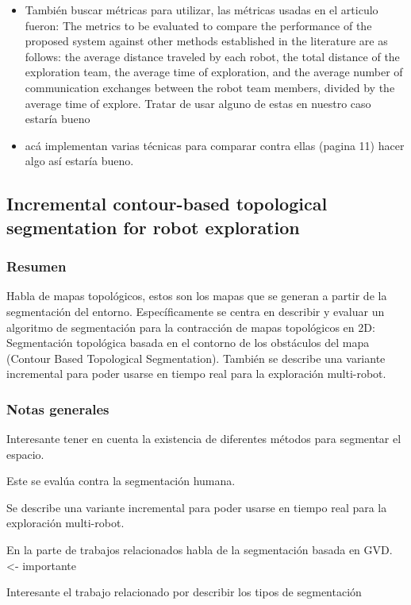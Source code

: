 \begin{itemize}
\item También buscar métricas para utilizar, las métricas usadas en el articulo fueron: The metrics to be evaluated to compare the performance of the proposed system against other methods established in the literature are as follows: the average distance traveled by each robot, the total distance of the exploration team, the average time of exploration, and the average number of communication exchanges between the robot team members, divided by the average time of explore. Tratar de usar alguno de estas en nuestro caso estaría bueno

\item acá implementan varias técnicas para comparar contra ellas (pagina 11) hacer algo así estaría bueno.
\end{itemize}

\subsection{Incremental contour-based topological segmentation for robot exploration}

\subsubsection{Resumen}
Habla de mapas topológicos, estos son los mapas que se generan a partir de la segmentación del entorno. 
Específicamente se centra en describir y evaluar un algoritmo de segmentación para la contracción de mapas topológicos en 2D: Segmentación topológica basada en el contorno de los obstáculos del mapa (Contour Based Topological Segmentation).
También se describe una variante incremental para poder usarse en tiempo real para la exploración multi-robot.

\subsubsection{Notas generales}
Interesante tener en cuenta la existencia de diferentes métodos para segmentar el espacio.

Este se evalúa contra la segmentación humana.

Se describe una variante incremental para poder usarse en tiempo real para la exploración multi-robot.

En la parte de trabajos relacionados habla de la segmentación basada en GVD. <- importante

Interesante el trabajo relacionado por describir los tipos de segmentación

